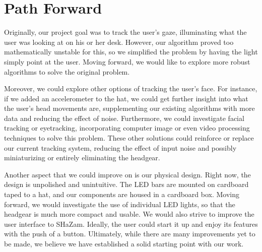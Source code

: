 \documentclass[conference, twocolumn]{IEEEtran}
\begin{document}
\section{Path Forward}
Originally, our project goal was to track the user's gaze, illuminating what the user was looking at on his or her desk. However, our algorithm proved too mathematically unstable for this, so we simplified the problem by having the light simply point at the user. Moving forward, we would like to explore more robust algorithms to solve the original problem. 

Moreover, we could explore other options of tracking the user's face. For instance, if we added an accelerometer to the hat, we could get further insight into what the user's head movements are, supplementing our existing algorithms with more data and reducing the effect of noise. Furthermore, we could investigate facial tracking or eyetracking, incorporating computer image or even video processing techniques to solve this problem. These other solutions could reinforce or replace our current tracking system, reducing the effect of input noise and possibly miniaturizing or entirely eliminating the headgear.

Another aspect that we could improve on is our physical design. Right now, the design is unpolished and unintuitive. The LED bars are mounted on cardboard taped to a hat, and our components are housed in a cardboard box. Moving forward, we would investigate the use of individual LED lights, so that the headgear is much more compact and usable. We would also strive to improve the user interface to SHaZam. Ideally, the user could start it up and enjoy its features with the push of a button. Ultimately, while there are many improvements yet to be made, we believe we have established a solid starting point with our work.


% 
%
%
%
\end{document}

